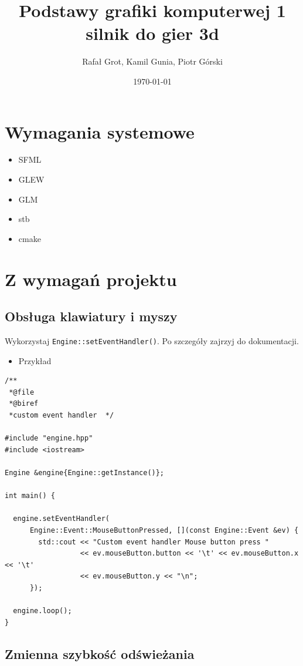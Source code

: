 \documentclass[11pt]{article}
\author{Rafał Grot, Kamil Gunia, Piotr Górski}
\date{\today}
\title{Podstawy grafiki komputerwej 1 silnik do gier 3d}
\begin{document}
\maketitle
\tableofcontents

\newpage
\section{Wymagania systemowe}
\label{sec:org4b8497f}
\begin{itemize}
\item SFML
\item GLEW
\item GLM
\item stb
\item cmake
\end{itemize}
\section{Z wymagań projektu}
\label{sec:orgf9dbc72}

\subsection{Obsługa klawiatury i myszy}
\label{sec:orgeba6bcd}

Wykorzystaj \texttt{Engine::setEventHandler()}. Po szczegóły zajrzyj do dokumentacji.

\begin{itemize}
\item Przykład
\end{itemize}
\begin{verbatim}
/**
 *@file
 *@biref
 *custom event handler  */

#include "engine.hpp"
#include <iostream>

Engine &engine{Engine::getInstance()};

int main() {

  engine.setEventHandler(
      Engine::Event::MouseButtonPressed, [](const Engine::Event &ev) {
        std::cout << "Custom event handler Mouse button press "
                  << ev.mouseButton.button << '\t' << ev.mouseButton.x << '\t'
                  << ev.mouseButton.y << "\n";
      });

  engine.loop();
}
\end{verbatim}
\subsection{Zmienna szybkość odświeżania}
\label{sec:org2c7ad5a}
\end{document}
